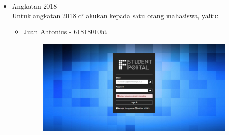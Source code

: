 \begin{itemize}
\begin{enumerate}
\begin{figure}[H]
			\caption{Halaman Jadwal Kuliah (Student Portal) - Henrico Leodra}
			\label{fig:2017_2_jadwal_kuliah_studentportal}
		\end{figure}
		Hasil pengujian eksperimental halaman persiapan perwalian dari IFStudentPortal yang berisi data akademik (IPS, IPK, IP Lulus, IP Nilai Terbaik, sks lulus, dan nilai TOEFL) dan data mata kuliah berserta prasyaratnya dapat dilihat pada Gambar \ref{fig:2017_2_persiapan_perwalian_ifstudentportal}. Gambar \ref{fig:2017_2_rip_studentportal} menunjukkan riwayat IP sedangkan Gambar \ref{fig:2017_2_nps_studentportal} menunjukkan salah satu nilai per semester mahasiswa dan Gambar \ref{fig:2017_2_toefl_studentportal} menunjukkan riwayat nilai TOEFL mahasiswa. Hasil tersebut menunjukkan bahwa halaman persiapan perwalian sudah sesuai dengan data mahasiswa pada Student Portal. Hasil pengujian berikutnya dapat dilihat pada Gambar \ref{fig:2017_2_syarat_kelulusan_ifstudentportal} menujukkan syarat lulus mahasiswa Teknik Informatika UNPAR sedangkan Gambar \ref{fig:2017_2_nps_studentportal} menujukkan salah satu data nilai hasil transisi ke kurikulum 2018. Hasil tersebut menunjukkan bahwa halaman syarat kelulusan telah sesuai dengan hasil yang diharapkan. Hasil pengujian berikutnya dapat dilihat pada Gambar \ref{fig:2017_2_jadwal_kuliah_ifstudentportal} menunjukan jadwal kuliah mahasiswa pada IFStudentPortal. Kemudian jadwal kuliah mahasiswa pada Student Portal dapat dilihat pada Gambar \ref{fig:2017_2_jadwal_kuliah_studentportal}. Hasil tersebut menunjukkan bahwa jadwal kuliah dari IFStudentPortal sudah sesuai dengan jadwal kuliah pada Student Portal.
	\end{enumerate}
	Hasil pengujian eksperimental dari kedua mahasiswa angkatan 2017 sesuai dengan hasil yang diharapkan.
	\item Angkatan 2018 \\
	Untuk angkatan 2018 dilakukan kepada satu orang mahasiswa, yaitu:
	\begin{itemize}
		\item Juan Antonius - 6181801059 \\
		\begin{figure}[H]
			\centering
			\includegraphics[scale=0.3]{Gambar/2018_1_error}

\end{figure}
\end{itemize}
\end{itemize}

